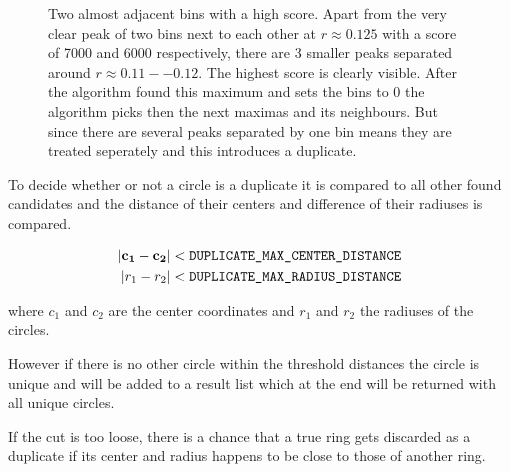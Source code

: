 \documentclass[11pt]{scrreprt}
\begin{document}
\begin{figure}[htb]
  \centering
 
  \caption[Histogram of duplicates]{Two almost adjacent bins with a high score\label{fig:2bins_highscore}. Apart from the very clear peak of two bins next to each
  other at $r \approx 0.125$ with a score of 7000 and 6000 respectively, there are 3 smaller peaks separated around $r \approx 0.11--0.12$.
  The highest score is clearly visible. After the algorithm found this maximum and sets the bins to 0 the algorithm picks then the next
  maximas and its neighbours. But since there are several peaks separated by one bin means they are treated seperately and this introduces
  a duplicate.}
\end{figure}

To decide whether or not a circle is a duplicate it is compared to all other found candidates and the distance of their centers and difference of their radiuses is compared.

\begin{equation}
\begin{aligned}
\left|\mathbf{c_1}-\mathbf{c_2}\right| &< \text{\texttt{DUPLICATE\_MAX\_CENTER\_DISTANCE}}\\
\left|r_1 - r_2\right| &< \text{\texttt{DUPLICATE\_MAX\_RADIUS\_DISTANCE}}
\end{aligned}
\label{eq:cut1}
\end{equation}

where $c_1$ and $c_2$ are the center coordinates and $r_1$ and $r_2$ the radiuses of the circles.

However if there is no other circle within the threshold distances the circle is unique and will be added to a result list which 
at the end will be returned with all unique circles. 

If the cut is too loose, there is a chance that a true ring gets discarded as a duplicate if its center and radius happens to be close to those of another ring.
\end{document}
